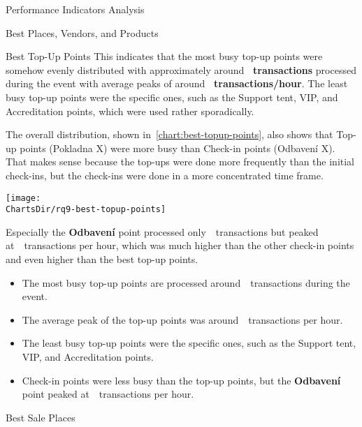 \begin{section}{Performance Indicators Analysis}
\begin{subsection}{Best Places, Vendors, and Products}
\begin{subsubsection}{Best Top-Up Points}
			This indicates that the most busy top-up points were somehow evenly distributed with approximately around \textbf{~transactions} processed during the event with average peaks of around \textbf{~transactions/hour}.
			The least busy top-up points were the specific ones, such as the Support tent, VIP, and Accreditation points, which were used rather sporadically.

			The overall distribution, shown in~\autoref{chart:best-topup-points}, also shows that Top-up points (Pokladna X) were more busy than Check-in points (Odbavení X).
			That makes sense because the top-ups were done more frequently than the initial check-ins, but the check-ins were done in a more concentrated time frame.

			\begin{chart}[H]
				\centering
				\texttt{[image: \\ChartsDir/rq9-best-topup-points]}
				\caption{ Best Top-Up Points}
				\label{chart:best-topup-points}
				\source
			\end{chart}

			Especially the \textbf{Odbavení} point processed only~~transactions but peaked at~~transactions per hour, which was much higher than the other check-in points and even higher than the best top-up points.

			\begin{keytakeaways}
				\begin{itemize}
					\item The most busy top-up points are processed around~~transactions during the event.
					\item The average peak of the top-up points was around~~transactions per hour.
					\item The least busy top-up points were the specific ones, such as the Support tent, VIP, and Accreditation points.
					\item Check-in points were less busy than the top-up points, but the \textbf{Odbavení} point peaked at~~transactions per hour.
				\end{itemize}
			\end{keytakeaways}

		\end{subsubsection}

		\pagebreak[4]

		\begin{subsubsection}{Best Sale Places}
			\label{subsubsec:analysis-best-sale-points}


\end{subsubsection}
\end{subsection}
\end{section}

